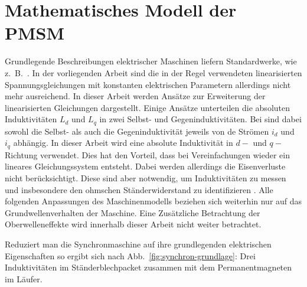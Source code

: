 \documentclass[conference,twocolumn]{IEEEtran}
\begin{document}
\tableofcontents

\section{Mathematisches Modell der PMSM}\label{sec:math-pmsm}

Grundlegende Beschreibungen elektrischer Maschinen liefern Standardwerke, wie z.~B.\ \autocites{mullerII2008}{mullerI2005}{fischer2009}{schroder2000}.
In der vorliegenden Arbeit sind die in der Regel verwendeten linearisierten Spannungsgleichungen mit konstanten elektrischen Parametern allerdings nicht mehr ausreichend.
In dieser Arbeit werden Ansätze zur Erweiterung der linearisierten Gleichungen dargestellt.
Einige Ansätze unterteilen die absoluten Induktivitäten $L_d$ und $L_q$ in zwei Selbst- und Gegeninduktivitäten.
Bei \autocite{sturmberger} sind dabei sowohl die Selbst- als auch die Gegeninduktivität jeweils von de Strömen $i_d$ und $i_q$ abhängig.
In dieser Arbeit wird eine absolute Induktivität in $d-$ und $q-$Richtung verwendet.
Dies hat den Vorteil, dass bei Vereinfachungen wieder ein lineares Gleichungssystem entsteht.
Dabei werden allerdings die Eisenverluste nicht berücksichtigt.
Diese sind aber notwendig, um Induktivitäten zu messen und insbesondere den ohmschen Ständerwiderstand zu identifizieren \autocite{Kellner2012}.
Alle folgenden Anpassungen des Maschinenmodells beziehen sich weiterhin nur auf das Grundwellenverhalten der Maschine.
Eine Zusätzliche Betrachtung der Oberwelleneffekte wird innerhalb dieser Arbeit nicht weiter betrachtet.

Reduziert man die Synchronmaschine auf ihre grundlegenden elektrischen Eigenschaften so ergibt sich nach Abb.~\ref{fig:synchron-grundlage}: Drei Induktivitäten im Ständerblechpacket zusammen mit dem Permanentmagneten im Läufer.
\end{document}
